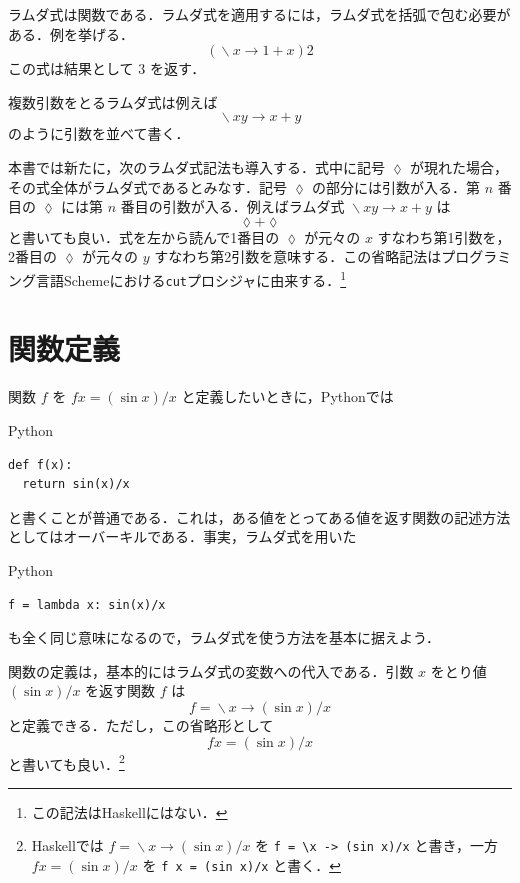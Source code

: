 \documentclass[a4paper]{jsbook}
\newcommand{\programminglanguage}[1]{\textsf{#1}}
\newcommand{\haskell}{\programminglanguage{Haskell}}
\newcommand{\python}{\programminglanguage{Python}}
\newcommand{\scheme}{\programminglanguage{Scheme}}
\newcommand{\code}[1]{\texttt{#1}}
\newenvironment{pythoncode}{\begin{itembox}[r]{\python}}{\end{itembox}}
\newcommand{\mAnonParameter}{\lozenge}
\DeclareMathOperator{\mLambda}{\backslash}
\DeclareMathOperator{\mLambdaArrow}{\rightarrow}
\newcommand{\mLambdaExp}[2]{\mLambda{#1}\mLambdaArrow{#2}}
\begin{document}
ラムダ式は関数である．ラムダ式を適用するには，ラムダ式を括弧で包む必要がある．例を挙げる．
\begin{equation}
(\mLambdaExp{x}{1+x})2
\end{equation}
この式は結果として $3$ を返す．

複数引数をとるラムダ式は例えば
\begin{equation}
\mLambdaExp{xy}{x+y}
\end{equation}
のように引数を並べて書く．

本書では新たに，次のラムダ式記法も導入する．式中に記号 $\mAnonParameter$ が現れた場合，その式全体がラムダ式であるとみなす．記号 $\mAnonParameter$ の部分には引数が入る．第 $n$ 番目の $\mAnonParameter$ には第 $n$ 番目の引数が入る．例えばラムダ式 $\mLambdaExp{xy}{x+y}$ は
\begin{equation}
\mAnonParameter+\mAnonParameter
\end{equation}
と書いても良い．式を左から読んで1番目の $\mAnonParameter$ が元々の $x$ すなわち第1引数を，2番目の $\mAnonParameter$ が元々の $y$ すなわち第2引数を意味する．この省略記法はプログラミング言語\scheme における\code{cut}プロシジャに由来する．\footnote{この記法は\haskell にはない．}

\section{関数定義}

関数 $f$ を $fx=(\sin x)/x$ と定義したいときに，\python では
\begin{pythoncode}
\begin{verbatim}
def f(x):
  return sin(x)/x
\end{verbatim}
\end{pythoncode}
と書くことが普通である．これは，ある値をとってある値を返す関数の記述方法としてはオーバーキルである．事実，ラムダ式を用いた
\begin{pythoncode}
\begin{verbatim}
f = lambda x: sin(x)/x
\end{verbatim}
\end{pythoncode}
も全く同じ意味になるので，ラムダ式を使う方法を基本に据えよう．

関数の定義は，基本的にはラムダ式の変数への代入である．引数 $x$ をとり値 $(\sin x)/x$ を返す関数 $f$ は
\begin{equation}
f=\mLambdaExp{x}{(\sin x)/x}
\end{equation}
と定義できる．ただし，この省略形として
\begin{equation}
fx=(\sin x)/x
\end{equation}
と書いても良い．\footnote{\haskell では $f=\mLambdaExp{x}{(\sin x)/x}$ を \code{f = \textbackslash x -> (sin x)/x} と書き，一方 $fx=(\sin x)/x$ を \code{f x = (sin x)/x} と書く．}
\end{document}
